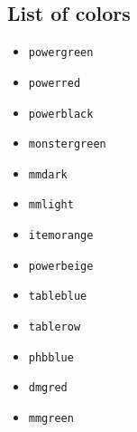 \documentclass[mmgreen]{dnd4e}
\begin{document}
\subsection{List of colors}

\begin{itemize}
	\item \color{powergreen}\texttt{powergreen}
	\item \color{powerred}\texttt{powerred}
	\item \color{powerblack}\texttt{powerblack}
	\item \color{monstergreen}\texttt{monstergreen}
	\item \color{mmdark}\texttt{mmdark}
	\item \color{mmlight}\texttt{mmlight}
	\item \color{itemorange}\texttt{itemorange}
	\item \color{powerbeige}\texttt{powerbeige}
	\item \color{tableblue}\texttt{tableblue}
	\item \color{tablerow}\texttt{tablerow}
	\item \color{phbblue}\texttt{phbblue}
	\item \color{dmgred}\texttt{dmgred}
	\item \color{mmgreen}\texttt{mmgreen}
\end{itemize}
\end{document}
